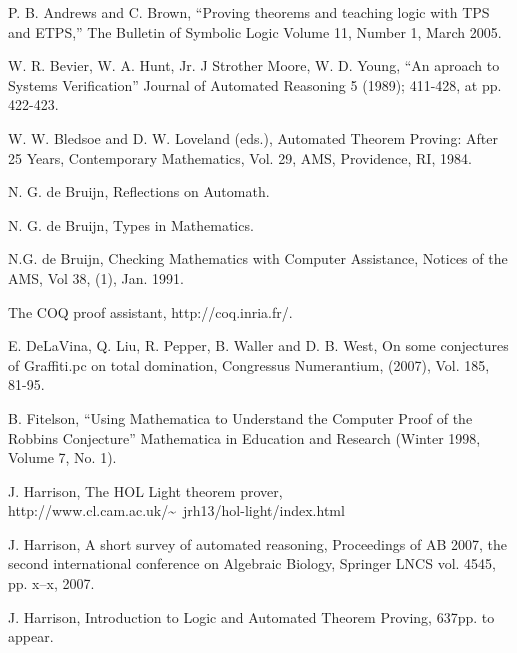\documentclass{llncs}
\begin{document}
\begin{thebibliography}{A}

 P. B. Andrews and C. Brown, ``Proving theorems and teaching logic with 
TPS and ETPS,'' The Bulletin of Symbolic Logic 
Volume 11, Number 1, March 2005.

 W. R. Bevier, W. A. Hunt, Jr. J Strother Moore, W. D. Young, ``An aproach to Systems Verification''  Journal of Automated Reasoning 5 (1989); 411-428, at pp. 422-423.

 W. W. Bledsoe and D. W. Loveland (eds.), Automated
Theorem Proving: After 25 Years, Contemporary Mathematics, Vol. 29,
AMS, Providence, RI, 1984.

 N. G. de Bruijn, Reflections on Automath.

 N. G. de Bruijn, Types in Mathematics.

  N.G. de Bruijn, Checking Mathematics with Computer Assistance, Notices of the AMS,
Vol 38, (1), Jan. 1991.

 The COQ proof assistant, http://coq.inria.fr/.



 E. DeLaVina, Q. Liu, R. Pepper, B. Waller and D. B. West, On some conjectures of
Graffiti.pc on total domination, Congressus Numerantium, (2007), Vol. 185, 81-95.

  B. Fitelson, ``Using Mathematica to Understand the Computer Proof of the Robbins Conjecture''
Mathematica in Education and Research (Winter 1998, Volume 7, No. 1).



 J. Harrison, The HOL Light theorem prover,
http://www.cl.cam.ac.uk/\~~jrh13/hol-light/index.html

 J. Harrison, A short survey of automated reasoning,
Proceedings of AB 2007, the second international conference on Algebraic Biology, Springer LNCS vol. 4545, pp. x--x, 2007.

 J. Harrison, Introduction to Logic and Automated
Theorem Proving, 637pp. to appear.


\end{thebibliography}
\end{document}
